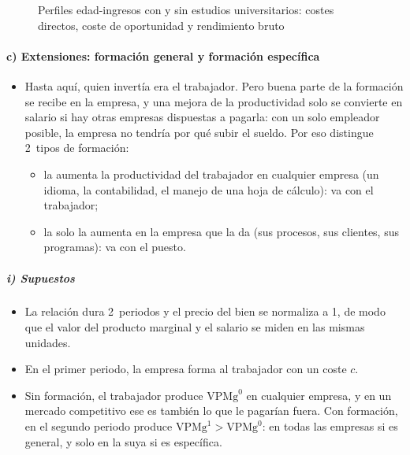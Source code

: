\documentclass[11pt]{article}
\begin{document}
\begin{figure}[H]
\centering
\caption{Perfiles edad-ingresos con y sin estudios universitarios: costes directos, coste de oportunidad y rendimiento bruto}\label{fig:perfiles-edad}
\end{figure}

\paragraph{c) Extensiones: formación general y formación específica}\label{sec:formacion-especifica}

\begin{itemize}
\item Hasta aquí, quien invertía era el trabajador. Pero buena parte de la formación se recibe en la empresa, y una mejora de la productividad solo se convierte en salario si hay otras empresas dispuestas a pagarla: con un solo empleador posible, la empresa no tendría por qué subir el sueldo. Por eso \textcite{Becker1964Human} distingue 2~tipos de formación:
  \begin{itemize}
  \item la  aumenta la productividad del trabajador en cualquier empresa (un idioma, la contabilidad, el manejo de una hoja de cálculo): va con el trabajador;
  \item la  solo la aumenta en la empresa que la da (sus procesos, sus clientes, sus programas): va con el puesto.
  \end{itemize}
\end{itemize}

\subparagraph{i) Supuestos}

\begin{itemize}
\item La relación dura 2~periodos y el precio del bien se normaliza a 1, de modo que el valor del producto marginal y el salario se miden en las mismas unidades.
\item En el primer periodo, la empresa forma al trabajador con un coste $c$.
\item Sin formación, el trabajador produce $\mathrm{VPMg}^0$ en cualquier empresa, y en un mercado competitivo ese es también lo que le pagarían fuera. Con formación, en el segundo periodo produce $\mathrm{VPMg}^1>\mathrm{VPMg}^0$: en todas las empresas si es general, y solo en la suya si es específica.
\end{itemize}
\end{document}
